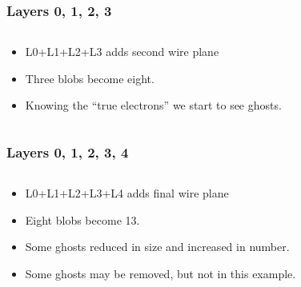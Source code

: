 \documentclass[xcolor=dvipsnames]{beamer}
\begin{document}
\begin{frame}
  \frametitle{Layers 0, 1, 2, 3}
  \begin{columns}
    \begin{column}{0.35\textwidth}
      \footnotesize
      \begin{itemize}
      \item L0+L1+L2+L3 adds second wire plane
      \item Three blobs become eight.
      \item Knowing the ``true electrons'' we start to see ghosts.
      \end{itemize}
      
    \end{column}

    \begin{column}{0.7\textwidth}

      \begin{center}
        \tiny
        
      \end{center}
    \end{column}

  \end{columns}
\end{frame}

\begin{frame}
  \frametitle{Layers 0, 1, 2, 3, 4}
  \begin{columns}
    \begin{column}{0.35\textwidth}
      \footnotesize
      \begin{itemize}
      \item L0+L1+L2+L3+L4 adds final wire plane
      \item Eight blobs become 13.
      \item Some ghosts reduced in size and increased in number. 
      \item Some ghosts may be removed, but not in this example.
      \end{itemize}
      
    \end{column}

    \begin{column}{0.7\textwidth}

      \begin{center}
        \tiny
        
      \end{center}
    \end{column}

  \end{columns}
\end{frame}
\end{document}
